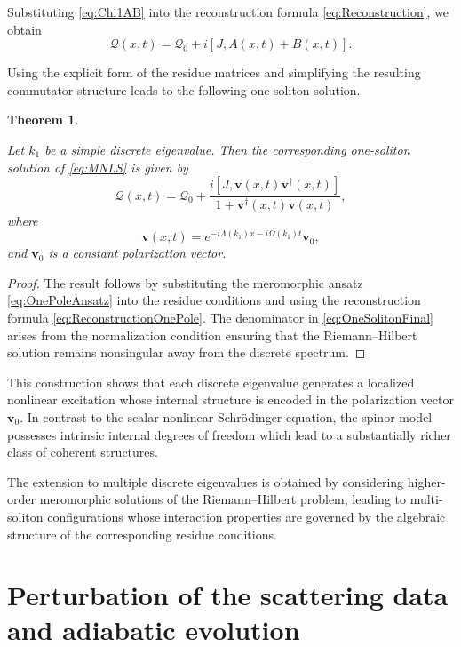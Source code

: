 \documentclass[11pt]{amsart}
\newtheorem{theorem}{Theorem}[section]
\theoremstyle{definition}
\numberwithin{equation}{section}
\begin{document}
Substituting \eqref{eq:Chi1AB} into the reconstruction formula \eqref{eq:Reconstruction}, we obtain
\begin{equation}
\mathcal Q(x,t)
=
\mathcal Q_0
+
i[J,A(x,t)+B(x,t)].
\label{eq:ReconstructionOnePole}
\end{equation}

Using the explicit form of the residue matrices and simplifying the resulting commutator structure leads to the following one-soliton solution.

\begin{theorem}
\label{thm_4_1}

Let $k_1$ be a simple discrete eigenvalue. Then the corresponding one-soliton solution of \eqref{eq:MNLS} is given by
\begin{equation}
\mathcal Q(x,t)
=
\mathcal Q_0
+
\frac{
i[J,\mathbf v(x,t)\mathbf v^\dagger(x,t)]
}{
1+\mathbf v^\dagger(x,t)\mathbf v(x,t)
},
\label{eq:OneSolitonFinal}
\end{equation}
where
\begin{equation}
\mathbf v(x,t)
=
e^{-i\Lambda(k_1)x-i\Omega(k_1)t}
\mathbf v_0,
\label{eq:PolarizationEvolution}
\end{equation}
and $\mathbf v_0$ is a constant polarization vector.
\end{theorem}

\begin{proof}
The result follows by substituting the meromorphic ansatz \eqref{eq:OnePoleAnsatz} into the residue conditions and using the reconstruction formula \eqref{eq:ReconstructionOnePole}. The denominator in \eqref{eq:OneSolitonFinal} arises from the normalization condition ensuring that the Riemann--Hilbert solution remains nonsingular away from the discrete spectrum.
\end{proof}

This construction shows that each discrete eigenvalue generates a localized nonlinear excitation whose internal structure is encoded in the polarization vector $\mathbf v_0$. In contrast to the scalar nonlinear Schr\"odinger equation, the spinor model possesses intrinsic internal degrees of freedom which lead to a substantially richer class of coherent structures.

The extension to multiple discrete eigenvalues is obtained by considering higher-order meromorphic solutions of the Riemann--Hilbert problem, leading to multi-soliton configurations whose interaction properties are governed by the algebraic structure of the corresponding residue conditions.
\section{Perturbation of the scattering data and adiabatic evolution}
\label{NVBC_spinor4}
\end{document}
